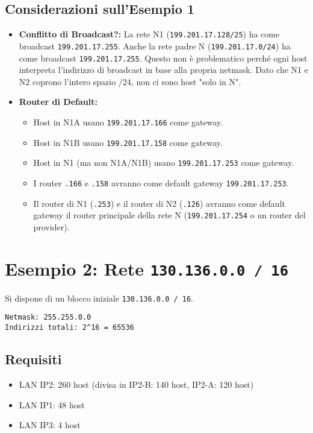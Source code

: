 \documentclass{article}
\begin{document}
\subsection{Considerazioni sull'Esempio 1}
\begin{itemize}
    \item \textbf{Conflitto di Broadcast?:} La rete N1 (\texttt{199.201.17.128/25}) ha come broadcast \texttt{199.201.17.255}. Anche la rete padre N (\texttt{199.201.17.0/24}) ha come broadcast \texttt{199.201.17.255}. Questo non è problematico perché ogni host interpreta l'indirizzo di broadcast in base alla propria netmask. Dato che N1 e N2 coprono l'intero spazio /24, non ci sono host "solo in N".
    \item \textbf{Router di Default:}
    \begin{itemize}
        \item Host in N1A usano \texttt{199.201.17.166} come gateway.
        \item Host in N1B usano \texttt{199.201.17.158} come gateway.
        \item Host in N1 (ma non N1A/N1B) usano \texttt{199.201.17.253} come gateway.
        \item I router \texttt{.166} e \texttt{.158} avranno come default gateway \texttt{199.201.17.253}.
        \item Il router di N1 (\texttt{.253}) e il router di N2 (\texttt{.126}) avranno come default gateway il router principale della rete N (\texttt{199.201.17.254} o un router del provider).
    \end{itemize}
\end{itemize}

\newpage
\section{Esempio 2: Rete \texttt{130.136.0.0 / 16}}
Si dispone di un blocco iniziale \texttt{130.136.0.0 / 16}.
\begin{verbatim}
Netmask: 255.255.0.0
Indirizzi totali: 2^16 = 65536
\end{verbatim}

\subsection{Requisiti}
\begin{itemize}
    \item LAN IP2: 260 host (divisa in IP2-B: 140 host, IP2-A: 120 host)
    \item LAN IP1: 48 host
    \item LAN IP3: 4 host
\end{itemize}
\end{document}
